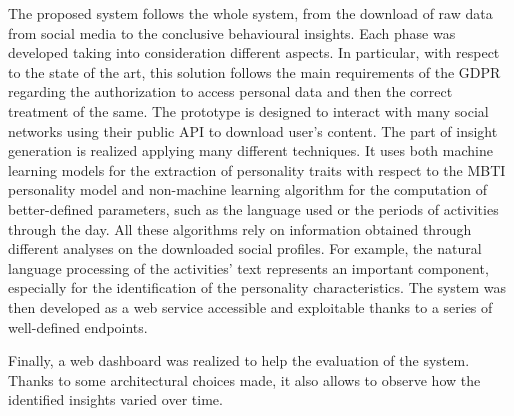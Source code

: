 The proposed system follows the whole system, from the download of raw data from social media to the conclusive behavioural insights. 
Each phase was developed taking into consideration different aspects. In particular, with respect to the state of the art, this solution follows the main requirements of the GDPR regarding the authorization to access personal data and then the correct treatment of the same.
The prototype is designed to interact with many social networks using their public API to download user's content. The part of insight generation is realized applying many different techniques.
It uses both machine learning models for the extraction of personality traits with respect to the MBTI personality model and non-machine learning algorithm for the computation of better-defined parameters, such as the language used or the periods of activities through the day.
All these algorithms rely on information obtained through different analyses on the downloaded social profiles. For example, the natural language processing of the activities' text represents an important component, especially for the identification of the personality characteristics.
The system was then developed as a web service accessible and exploitable thanks to a series of well-defined endpoints.

Finally, a web dashboard was realized to help the evaluation of the system. Thanks to some architectural choices made, it also allows to observe how the identified insights varied over time.